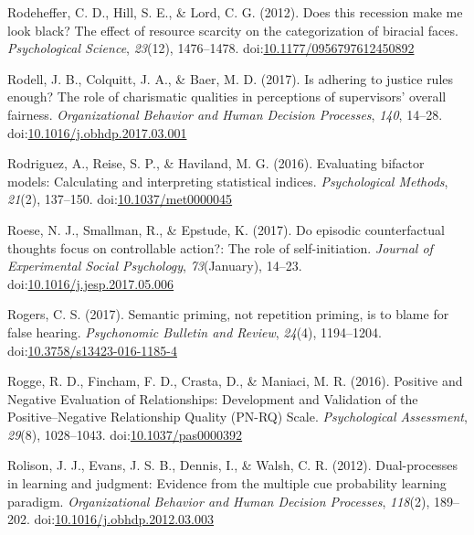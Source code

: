 \documentclass[english,man]{apa6}
\theoremstyle{definition}
\theoremstyle{definition}
\theoremstyle{definition}
\theoremstyle{remark}
\begin{document}
\hypertarget{ref-Rodeheffer2012}{}
Rodeheffer, C. D., Hill, S. E., \& Lord, C. G. (2012). Does this
recession make me look black? The effect of resource scarcity on the
categorization of biracial faces. \emph{Psychological Science},
\emph{23}(12), 1476--1478.
doi:\href{https://doi.org/10.1177/0956797612450892}{10.1177/0956797612450892}

\hypertarget{ref-Rodell2017}{}
Rodell, J. B., Colquitt, J. A., \& Baer, M. D. (2017). Is adhering to
justice rules enough? The role of charismatic qualities in perceptions
of supervisors' overall fairness. \emph{Organizational Behavior and
Human Decision Processes}, \emph{140}, 14--28.
doi:\href{https://doi.org/10.1016/j.obhdp.2017.03.001}{10.1016/j.obhdp.2017.03.001}

\hypertarget{ref-Rodriguez2016}{}
Rodriguez, A., Reise, S. P., \& Haviland, M. G. (2016). Evaluating
bifactor models: Calculating and interpreting statistical indices.
\emph{Psychological Methods}, \emph{21}(2), 137--150.
doi:\href{https://doi.org/10.1037/met0000045}{10.1037/met0000045}

\hypertarget{ref-Roese2017}{}
Roese, N. J., Smallman, R., \& Epstude, K. (2017). Do episodic
counterfactual thoughts focus on controllable action?: The role of
self-initiation. \emph{Journal of Experimental Social Psychology},
\emph{73}(January), 14--23.
doi:\href{https://doi.org/10.1016/j.jesp.2017.05.006}{10.1016/j.jesp.2017.05.006}

\hypertarget{ref-Rogers2016}{}
Rogers, C. S. (2017). Semantic priming, not repetition priming, is to
blame for false hearing. \emph{Psychonomic Bulletin and Review},
\emph{24}(4), 1194--1204.
doi:\href{https://doi.org/10.3758/s13423-016-1185-4}{10.3758/s13423-016-1185-4}

\hypertarget{ref-Rogge2017}{}
Rogge, R. D., Fincham, F. D., Crasta, D., \& Maniaci, M. R. (2016).
Positive and Negative Evaluation of Relationships: Development and
Validation of the Positive--Negative Relationship Quality (PN-RQ) Scale.
\emph{Psychological Assessment}, \emph{29}(8), 1028--1043.
doi:\href{https://doi.org/10.1037/pas0000392}{10.1037/pas0000392}

\hypertarget{ref-Rolison2012}{}
Rolison, J. J., Evans, J. S. B., Dennis, I., \& Walsh, C. R. (2012).
Dual-processes in learning and judgment: Evidence from the multiple cue
probability learning paradigm. \emph{Organizational Behavior and Human
Decision Processes}, \emph{118}(2), 189--202.
doi:\href{https://doi.org/10.1016/j.obhdp.2012.03.003}{10.1016/j.obhdp.2012.03.003}
\end{document}
